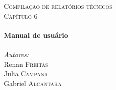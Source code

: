 \center %
 

\textsc{\LARGE Compilação de relatórios técnicos}\\[1.5cm]
\textsc{\Large Capítulo 6}\\[0.5cm] 


\HRule \\[0.4cm]
{ \huge \bfseries Manual de usuário}\\[0.4cm] %
\HRule \\[1.5cm]
 


\Large \emph{Autores:}\\
Renan \textsc{Freitas}\\
Julia \textsc{Campana}\\
Gabriel \textsc{Alcantara}\\

